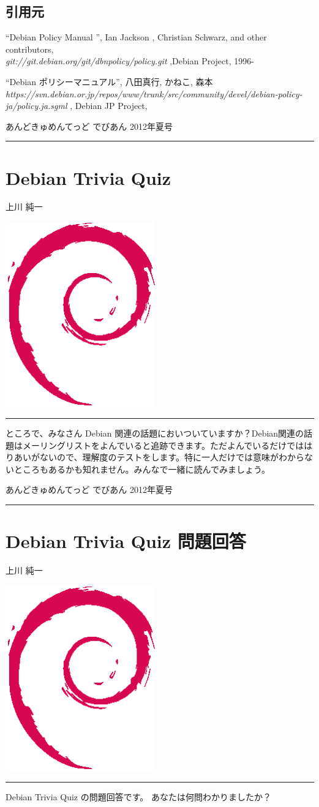 \documentclass[mingoth,a4paper]{jsarticle}
\renewcommand{\dancersection}[2]{%
\newpage
あんどきゅめんてっど でびあん 2012年夏号
%
\vspace{0.1mm}\\
{\color{dancerdarkblue}\rule{\hsize}{2mm}}

%
%
\begin{minipage}[t]{0.6\hsize}
\color{dancerdarkblue}
\vspace{1cm}
\section{#1}
\hfill{}#2\\
\end{minipage}
\begin{minipage}[t]{0.4\hsize}
\vspace{-2cm}
\hfill{}\includegraphics[height=8cm]{image200502/openlogo-nd.eps}\\
\vspace{-5cm}
\end{minipage}
%
{\color{dancerlightblue}\rule{0.66\hsize}{2mm}}
%
\vspace{2cm}
}
\begin{document}
\subsection{引用元}

\begin{list}{}{\setlength{\itemindent}{-2em}\setlength{\itemsep}{1ex plus 1ex}}
\item ``Debian Policy Manual '', Ian Jackson ,  Christian Schwarz, and other contributors,\hfill \\  {\it git://git.debian.org/git/dbnpolicy/policy.git} ,Debian Project, 1996-

\item ``Debian ポリシーマニュアル'', 八田真行, かねこ, 森本\hfill \\ {\it https://svn.debian.or.jp/repos/www/trunk/src/community/devel/debian-policy-ja/policy.ja.sgml} , Debian JP Project,
\end{list}

\clearpage

\dancersection{Debian Trivia Quiz}{上川 純一}

ところで、みなさん Debian 関連の話題においついていますか？Debian関連の話
題はメーリングリストをよんでいると追跡できます。ただよんでいるだけではは
りあいがないので、理解度のテストをします。特に一人だけでは意味がわからな
いところもあるかも知れません。みんなで一緒に読んでみましょう。


\begin{multicols}{2}
 
\end{multicols}

\cleartoevenpage
\dancersection{Debian Trivia Quiz 問題回答}{上川 純一}

 Debian Trivia Quiz の問題回答です。
 あなたは何問わかりましたか？
 \\
\end{document}
